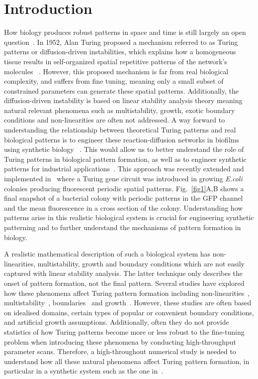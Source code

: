 \section{Introduction}

How biology produces robust patterns in space and time is still largely an open question~\parencite{scholes2017three}.
In 1952, Alan Turing proposed a mechanism referred to as Turing patterns or diffusion-driven instabilities, which explains how a homogeneous tissue results in self-organized spatial repetitive patterns of the network’s molecules ~\parencite{Turing1952, Gierer1972}.
However, this proposed mechanism is far from real biological complexity, and suffers from fine tuning, meaning only a small subset of constrained parameters can generate these spatial patterns.
Additionally, the diffusion-driven instability is based on linear stability analysis theory meaning natural relevant phenomena such as multistability, growth, exotic boundary conditions and non-linearities are often not addressed.
A way forward to understanding the relationship between theoretical Turing patterns and real biological patterns is to engineer these reaction-diffusion networks in biofilms using synthetic biology ~\parencite{Sekine2018, Karig2018}.
This would allow us to better understand the role of Turing patterns in biological pattern formation, as well as to engineer synthetic patterns for industrial applications~\parencite{cao2017programmable, tan2018polyamide,din2020interfacing}.
This approach was recently extended and implemented in~\cite{Oliver2023} where a Turing gene circuit was introduced in growing \textit{E.coli} colonies producing fluorescent periodic spatial patterns. Fig.~\ref{fig1}A,B shows a final snapshot of a bacterial colony with periodic patterns in the GFP channel and the mean fluorescence in a cross section of the colony.
Understanding how patterns arise in this realistic biological system is crucial for engineering synthetic patterning and to further understand the mechanisms of pattern formation in biology.  

A realistic mathematical description of such a biological system has non-linearities, multistability, growth and boundary conditions which are not easily captured with linear stability analysis. The latter technique only describes the onset of pattern formation, not the final pattern.
Several studies have explored how these phenomena affect Turing pattern formation including non-linearities~\parencite{ermentrout1991stripes}, multistability~\parencite{Krause2023}, boundaries~\parencite{Arcuri1986,Maini1993, Maini1997,Krause2020, Krause2021, Woolley2022} and growth~\parencite{gaffney2010, Klika2017, Krause2019}.
However, these studies are often based on idealised domains, certain types of popular or convenient boundary conditions, and artificial growth assumptions.
Additionally, often they do not provide statistics of how Turing patterns become more or less robust to the fine-tuning problem when introducing these phenomena by conducting high-throughput parameter scans.
Therefore, a high-throughout numerical study is needed to understand how all these natural phenomena affect Turing pattern formation, in particular in a synthetic system such as the one in~\cite{Oliver2023}.

